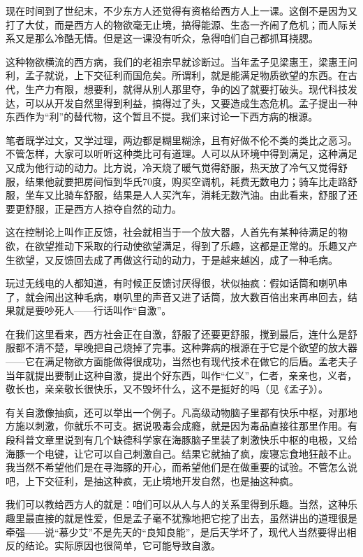 现在时间到了世纪末，不少东方人还觉得有资格给西方人上一课。这倒不是因为又打了大仗，而是西方人的物欲毫无止境，搞得能源、生态一齐闹了危机；而人际关系又是那么冷酷无情。但是这一课没有听众，急得咱们自己都抓耳挠腮。 

这种物欲横流的西方病，我们的老祖宗早就诊断过。当年孟子见梁惠王，梁惠王问利，孟子就说，上下交征利而国危矣。所谓利，就是能满足物质欲望的东西。在古代，生产力有限，想要利，就得从别人那里夺，争的凶了就要打破头。现代科技发达，可以从开发自然里得到利益，搞得过了头，又要造成生态危机。孟子提出一种东西作为“利”的替代物，这个暂且不提。我们来讨论一下西方病的根源。 

笔者既学过文，又学过理，两边都是糊里糊涂，且有好做不伦不类的类比之恶习。不管怎样，大家可以听听这种类比可有道理。人可以从环境中得到满足，这种满足又成为他行动的动力。比方说，冷天烧了暖气觉得舒服，热天放了冷气又觉得舒服，结果他就要把房间恒到华氏70度，购买空调机，耗费无数电力；骑车比走路舒服，坐车又比骑车舒服，结果是人人买汽车，消耗无数汽油。由此看来，舒服了还要更舒服，正是西方人掠夺自然的动力。 

这在控制论上叫作正反馈，社会就相当于一个放大器，人首先有某种待满足的物欲，在欲望推动下采取的行动使欲望满足，得到了乐趣，这都是正常的。乐趣又产生欲望，又反馈回去成了再做这行动的动力，于是越来越凶，成了一种毛病。 

玩过无线电的人都知道，有时候正反馈讨厌得很，状似抽疯：假如话筒和喇叭串了，就会闹出这种毛病，喇叭里的声音又进了话筒，放大数百倍出来再串回去，结果就是要吵死人——行话叫作“自激”。 

在我们这里看来，西方社会正在自激，舒服了还要更舒服，搅到最后，连什么是舒服都不清不楚，早晚把自己烧掉了完事。这种弊病的根源在于它是个欲望的放大器——它在满足物欲方面能做得很成功，当然也有现代技术在做它的后盾。孟老夫子当年就提出要制止这种自激，提出个好东西，叫作“仁义”，仁者，亲亲也，义者，敬长也，亲亲敬长很快乐，又不毁坏什么，这不是挺好的吗（见《孟子》）。 

有关自激像抽疯，还可以举出一个例子。凡高级动物脑子里都有快乐中枢，对那地方施以刺激，你就乐不可支。据说吸毒会成瘾，就是因为毒品直接往那里作用。有段科普文章里说到有几个缺德科学家在海豚脑子里装了刺激快乐中枢的电极，又给海豚一个电键，让它可以自己刺激自己。结果它就抽了疯，废寝忘食地狂敲不止。我当然不希望他们是在寻海豚的开心，而希望他们是在做重要的试验。不管怎么说吧，上下交征利，是抽这种疯，无止境地开发自然，也是抽这种疯。 

我们可以教给西方人的就是：咱们可以从人与人的关系里得到乐趣。当然，这种乐趣里最直接的就是性爱，但是孟子毫不犹豫地把它挖了出去，虽然讲出的道理很是牵强——说“慕少艾”不是先天的“良知良能”，是后天学坏了，现代人当然要得出相反的结论。实际原因也很简单，它可能导致自激。 

